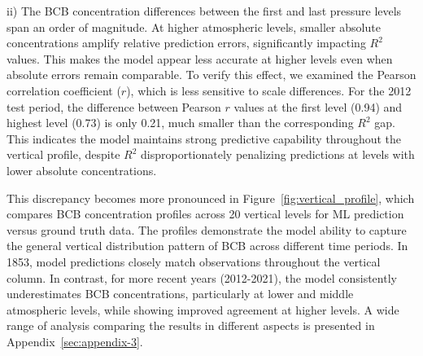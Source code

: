 \documentclass{article}
\begin{document}
    ii) The BCB concentration differences between the first and last pressure levels span an order of magnitude. At higher atmospheric levels, smaller absolute concentrations amplify relative prediction errors, significantly impacting $R^2$ values. This makes the model appear less accurate at higher levels even when absolute errors remain comparable. To verify this effect, we examined the Pearson correlation coefficient ($r$), which is less sensitive to scale differences. For the 2012 test period, the difference between Pearson $r$ values at the first level (0.94) and highest level (0.73) is only 0.21, much smaller than the corresponding $R^2$ gap. This indicates the model maintains strong predictive capability throughout the vertical profile, despite $R^2$ disproportionately penalizing predictions at levels with lower absolute concentrations.
    
    This discrepancy becomes more pronounced in Figure~\ref{fig:vertical_profile}, which compares BCB concentration profiles across 20 vertical levels for ML prediction versus ground truth data.
    The profiles demonstrate the model ability to capture the general vertical distribution pattern of BCB across different time periods. In 1853, model predictions closely match observations throughout the vertical column. In contrast, for more recent years (2012-2021), the model consistently underestimates BCB concentrations, particularly at lower and middle atmospheric levels, while showing improved agreement at higher levels. A wide range of analysis comparing the results in different aspects is presented in Appendix~\ref{sec:appendix-3}.
        
\end{document}
